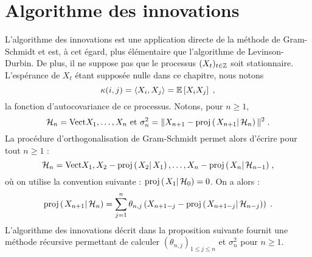 \section{Algorithme des innovations}
\label{sec:algorithmes-des-innovations}
L'algorithme des innovations est une application directe de la m\'ethode de Gram-Schmidt et est, \`a cet
\'egard, plus \'el\'ementaire que l'algorithme de Levinson-Durbin. De plus, il ne suppose pas que le processus
$(X_t)_{t \in \mathbb{Z}}$ soit stationnaire. L'esp\'erance de $X_t$ \'etant
suppos\'ee nulle dans ce chapitre, nous notons
\[
\kappa(i,j)= \left\langle X_i, X_j \right\rangle= {\mathbb E}\left[ X_iX_j \right] \;,
\]
la fonction d'autocovariance de ce processus.
Notons, pour $n \geq 1$,
$$\cH_n= \lspan{X_1,\dots,X_n} \textrm{ et }
\sigma_n^2= \| X_{n+1} - \proj{X_{n+1}}{\cH_n}\|^2\;.
$$
La proc\'edure d'orthogonalisation de Gram-Schmidt permet alors d'\'ecrire
pour tout $n \geq 1$ :
\[
\cH_n= \lspan{X_1, X_2 - \proj{X_2}{X_1}, \dots, X_n - \proj{X_n}{\cH_{n-1}}} \eqsp,
\]
o\`u on utilise la convention suivante : $\proj{X_1}{\cH_{0}}=0$.
On a alors :
\begin{equation}
\label{eq:definition-projecteur}
\proj{X_{n+1}}{\cH_n}= \sum_{j=1}^n \theta_{n,j} \left( X_{n+1-j} - \proj{X_{n+1-j}}{\cH_{n-j}}\right) \eqsp.
\end{equation}
L'algorithme des innovations d\'ecrit dans la proposition suivante
fournit une m\'ethode r\'ecursive permettant de calculer
$(\theta_{n,j})_{1\leq j\leq n}$ et $\sigma_n^2$ pour $n\geq 1$.


